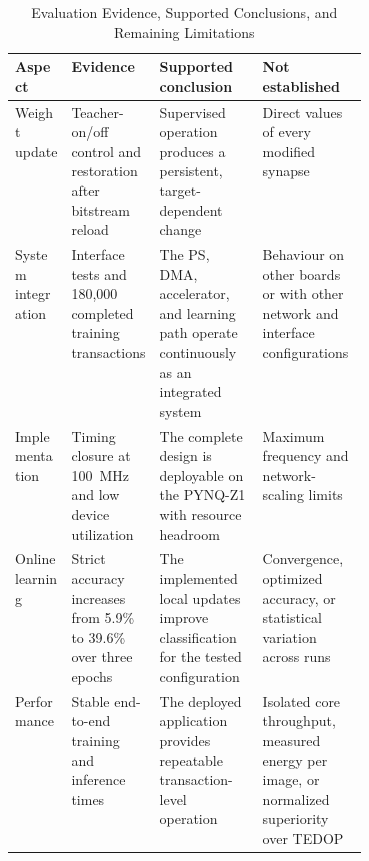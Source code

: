 \begin{table}[htbp]
	\centering
	\caption{Evaluation Evidence, Supported Conclusions, and Remaining Limitations}
	\label{tab:evaluation-evidence-and-limitations}
	\small
	\begin{tabularx}{\linewidth}{@{}p{0.16\linewidth}p{0.25\linewidth}X X@{}}
		\toprule
		\textbf{Aspect} & \textbf{Evidence} & \textbf{Supported conclusion} & \textbf{Not established} \\
		\midrule
		Weight update & Teacher-on/off control and restoration after bitstream reload & Supervised operation produces a persistent, target-dependent change & Direct values of every modified synapse \\
		System integration & Interface tests and 180,000 completed training transactions & The PS, DMA, accelerator, and learning path operate continuously as an integrated system & Behaviour on other boards or with other network and interface configurations \\
		Implementation & Timing closure at 100~MHz and low device utilization & The complete design is deployable on the PYNQ-Z1 with resource headroom & Maximum frequency and network-scaling limits \\
		Online learning & Strict accuracy increases from 5.9\% to 39.6\% over three epochs & The implemented local updates improve classification for the tested configuration & Convergence, optimized accuracy, or statistical variation across runs \\
		Performance & Stable end-to-end training and inference times & The deployed application provides repeatable transaction-level operation & Isolated core throughput, measured energy per image, or normalized superiority over TEDOP \\
		\bottomrule
	\end{tabularx}
\end{table}
